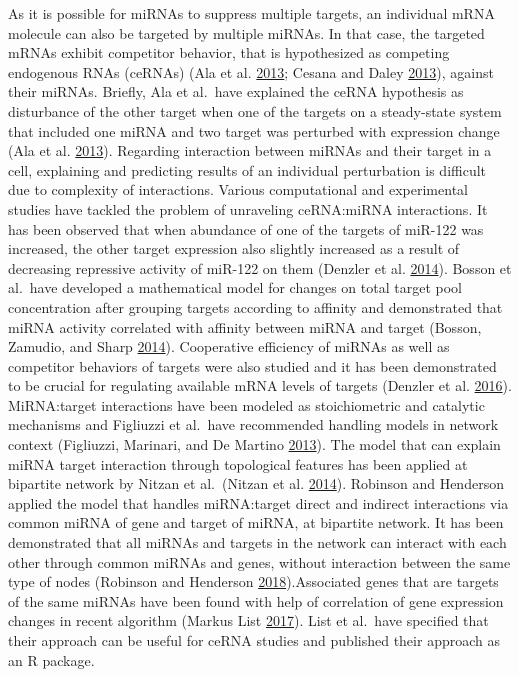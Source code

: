\documentclass[]{article}
\begin{document}
As it is possible for miRNAs to suppress multiple targets, an individual
mRNA molecule can also be targeted by multiple miRNAs. In that case, the
targeted mRNAs exhibit competitor behavior, that is hypothesized as
competing endogenous RNAs (ceRNAs) (Ala et al.
\protect\hyperlink{ref-ala_integrated_2013}{2013}; Cesana and Daley
\protect\hyperlink{ref-cesana_deciphering_2013}{2013}), against their
miRNAs. Briefly, Ala et al.~have explained the ceRNA hypothesis as
disturbance of the other target when one of the targets on a
steady-state system that included one miRNA and two target was perturbed
with expression change (Ala et al.
\protect\hyperlink{ref-ala_integrated_2013}{2013}). Regarding
interaction between miRNAs and their target in a cell, explaining and
predicting results of an individual perturbation is difficult due to
complexity of interactions. Various computational and experimental
studies have tackled the problem of unraveling ceRNA:miRNA interactions.
It has been observed that when abundance of one of the targets of
miR-122 was increased, the other target expression also slightly
increased as a result of decreasing repressive activity of miR-122 on
them (Denzler et al.
\protect\hyperlink{ref-denzler_assessing_2014}{2014}). Bosson et
al.~have developed a mathematical model for changes on total target pool
concentration after grouping targets according to affinity and
demonstrated that miRNA activity correlated with affinity between miRNA
and target (Bosson, Zamudio, and Sharp
\protect\hyperlink{ref-bosson_endogenous_2014}{2014}). Cooperative
efficiency of miRNAs as well as competitor behaviors of targets were
also studied and it has been demonstrated to be crucial for regulating
available mRNA levels of targets (Denzler et al.
\protect\hyperlink{ref-denzler_impact_2016}{2016}). MiRNA:target
interactions have been modeled as stoichiometric and catalytic
mechanisms and Figliuzzi et al.~have recommended handling models in
network context (Figliuzzi, Marinari, and De Martino
\protect\hyperlink{ref-figliuzzi_micrornas_2013}{2013}). The model that
can explain miRNA target interaction through topological features has
been applied at bipartite network by Nitzan et al.~(Nitzan et al.
\protect\hyperlink{ref-nitzan_interactions_2014}{2014}). Robinson and
Henderson applied the model that handles miRNA:target direct and
indirect interactions via common miRNA of gene and target of miRNA, at
bipartite network. It has been demonstrated that all miRNAs and targets
in the network can interact with each other through common miRNAs and
genes, without interaction between the same type of nodes (Robinson and
Henderson
\protect\hyperlink{ref-robinson_modelling_2018}{2018}).Associated genes
that are targets of the same miRNAs have been found with help of
correlation of gene expression changes in recent algorithm (Markus List
\protect\hyperlink{ref-markus_list_sponge_2017}{2017}). List et al.~have
specified that their approach can be useful for ceRNA studies and
published their approach as an R package.
\end{document}
